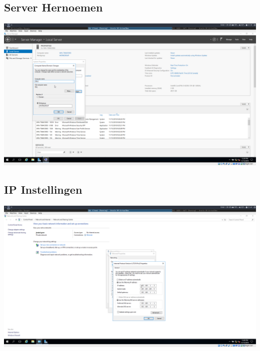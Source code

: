 \documentclass[a4paper]{article}
\begin{document}
\subsection{Server Hernoemen}
\begin{center}
	\includegraphics[width=15cm]{Pictures/SQL/1542314353.png}
\end{center}
\subsection{IP Instellingen}
\begin{center}
	\includegraphics[width=15cm]{Pictures/SQL/1542314452.png}
\end{center}
\end{document}
